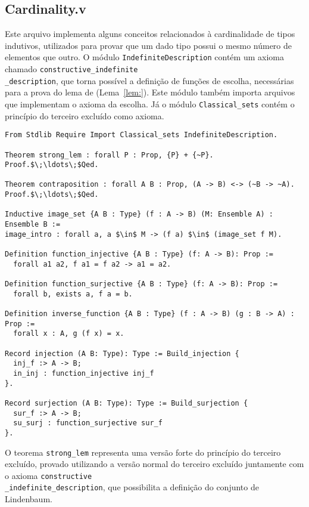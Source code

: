    \subsection{Cardinality.v}\label{sec:cardinality}

        Este arquivo implementa alguns conceitos relacionados à cardinalidade de tipos indutivos, utilizados para provar que um dado tipo possui o mesmo número de elementos que outro. O módulo \texttt{IndefiniteDescription} contém um axioma chamado \texttt{constructive\_indefinite\\\_description}, que torna possível a definição de funções de escolha, necessárias para a prova do lema de  (Lema~\ref{lem:}). Este módulo também importa arquivos que implementam o axioma da escolha. Já o módulo \texttt{Classical\_sets} contém o princípio do terceiro excluído como axioma.

        \begin{lstlisting}[name=LFI, frame=single, language=coq]
From Stdlib Require Import Classical_sets IndefiniteDescription.

Theorem strong_lem : forall P : Prop, {P} + {~P}.
Proof.$\;\ldots\;$Qed. 

Theorem contraposition : forall A B : Prop, (A -> B) <-> (~B -> ~A).
Proof.$\;\ldots\;$Qed.

Inductive image_set {A B : Type} (f : A -> B) (M: Ensemble A) : Ensemble B :=
image_intro : forall a, a $\in$ M -> (f a) $\in$ (image_set f M).

Definition function_injective {A B : Type} (f: A -> B): Prop :=
  forall a1 a2, f a1 = f a2 -> a1 = a2.

Definition function_surjective {A B : Type} (f: A -> B): Prop :=
  forall b, exists a, f a = b.
  
Definition inverse_function {A B : Type} (f : A -> B) (g : B -> A) : Prop :=
  forall x : A, g (f x) = x.

Record injection (A B: Type): Type := Build_injection {
  inj_f :> A -> B;
  in_inj : function_injective inj_f
}.

Record surjection (A B: Type): Type := Build_surjection {
  sur_f :> A -> B;
  su_surj : function_surjective sur_f
}.
          \end{lstlisting}

          O teorema \texttt{strong\_lem} representa uma versão forte do princípio do terceiro excluído, provado utilizando a versão normal do terceiro excluído juntamente com o axioma \texttt{constructive\\\_indefinite\_description}, que possibilita a definição do conjunto de Lindenbaum.
          
